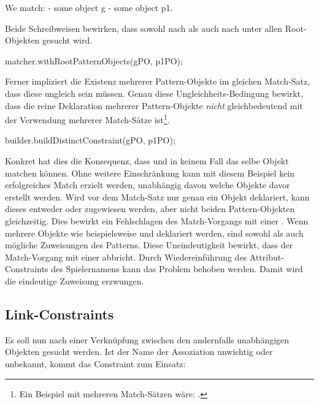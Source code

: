 \begin{mdcodeblock}
    We match:
    - some object g
    - some object p1.
\end{mdcodeblock}

Beide Schreibweisen bewirken, dass sowohl nach  als auch nach  unter allen Root-Objekten gesucht wird.

\begin{jcodeblock}
    matcher.withRootPatternObjects(gPO, p1PO);
\end{jcodeblock}

Ferner impliziert die Existenz mehrerer Pattern-Objekte im gleichen Match-Satz, dass diese ungleich sein müssen.
Genau diese Ungleichheits-Bedingung bewirkt, dass die reine Deklaration mehrerer Pattern-Objekte \emph{nicht} gleichbedeutend mit der Verwendung mehrerer Match-Sätze ist\footnote{Ein Beispiel mit mehreren Match-Sätzen wäre: .}.

\begin{jcodeblock}
    builder.buildDistinctConstraint(gPO, p1PO);
\end{jcodeblock}

Konkret hat dies die Konsequenz, dass  und  in keinem Fall das selbe Objekt matchen können.
Ohne weitere Einschränkung kann mit diesem Beispiel kein erfolgreiches Match erzielt werden, unabhängig davon welche Objekte davor erstellt werden.
Wird vor dem Match-Satz nur genau ein Objekt deklariert, kann dieses entweder  oder  zugewiesen werden, aber nicht beiden Pattern-Objekten gleichzeitig.
Dies bewirkt ein Fehlschlagen des Match-Vorgangs mit einer .
Wenn mehrere Objekte wie beispielsweise  und  deklariert werden, sind sowohl  als auch  mögliche Zuweisungen des Patterns.
Diese Uneindeutigkeit bewirkt, dass der Match-Vorgang mit einer  abbricht.
Durch Wiedereinführung des Attribut-Constraints des Spielernamens kann das Problem behoben werden.
Damit wird die eindeutige Zuweisung  erzwungen.

\subsection{Link-Constraints}

Es soll nun nach einer Verknüpfung zwischen den andernfalls unabhängigen Objekten gesucht werden.
Ist der Name der Assoziation unwichtig oder unbekannt, kommt das Constraint  zum Einsatz:

